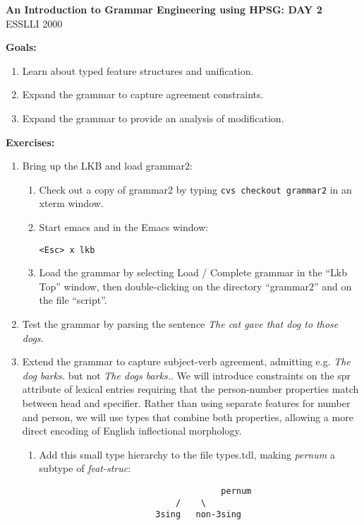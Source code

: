 \documentclass[10pt]{article}
\begin{document}
\begin{center}
\textbf{An Introduction to Grammar Engineering using HPSG: DAY 2}\\
ESSLLI 2000
\end{center}

\medskip
\textbf{Goals:}
\begin{enumerate}
\item Learn about typed feature structures and unification.
\item Expand the grammar to capture agreement constraints.
\item Expand the grammar to provide an analysis of modification.
\end{enumerate}

\smallskip
\textbf{Exercises:}
\begin{enumerate}
\item Bring up
the LKB and load grammar2:
\begin{enumerate}
\item Check out a copy of grammar2 by typing {\tt cvs checkout grammar2} in 
an xterm window. 
\item Start emacs and in the Emacs window:
\par\texttt{<Esc> x lkb}
\item Load the grammar by selecting \textsf{Load / Complete
grammar} in the 
``Lkb Top'' window, then double-clicking on the directory ``grammar2'' and on the
file ``script''. 
\end{enumerate}
\item Test the grammar by parsing the sentence {\it The cat gave that dog to 
those dogs.}
\item Extend the grammar to capture subject-verb agreement, admitting e.g.
{\it The dog barks.} but not {\it *The dogs barks.}.  We will introduce 
constraints on the {\sc spr} attribute of lexical entries requiring that the
person-number properties match between head and specifier.  Rather than using
separate features for number and person, we will use types that combine both
properties, allowing a more direct encoding of English inflectional morphology.
\begin{enumerate}
\item Add this small type hierarchy to the file types.tdl, making {\it pernum}
a subtype of {\it feat-struc}:
\begin{verbatim}
                          			pernum
                           /    \
                       3sing   non-3sing
\end{verbatim}

\end{enumerate}
\end{enumerate}
\end{document}
